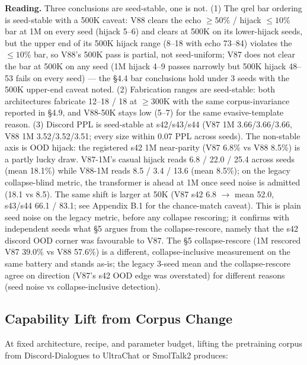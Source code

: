 \documentclass[11pt]{article}
\begin{document}
\textbf{Reading.} Three conclusions are seed-stable, one is not. (1) The qrel bar ordering is seed-stable with a 500K caveat: V88 clears the echo $\geq 50\%$ / hijack $\leq 10\%$ bar at 1M on every seed (hijack 5--6) and clears at 500K on its lower-hijack seeds, but the upper end of its 500K hijack range (8--18 with echo 73--84) violates the $\leq 10\%$ bar, so V88's 500K pass is partial, not seed-uniform; V87 does not clear the bar at 500K on any seed (1M hijack 4--9 passes narrowly but 500K hijack 48--53 fails on every seed) --- the \S4.4 bar conclusions hold under 3 seeds with the 500K upper-end caveat noted. (2) Fabrication ranges are seed-stable: both architectures fabricate 12--18 / 18 at $\geq 300$K with the same corpus-invariance reported in \S4.9, and V88-50K stays low (5--7) for the same evasive-template reason. (3) Discord PPL is seed-stable at s42/s43/s44 (V87 1M 3.66/3.66/3.66, V88 1M 3.52/3.52/3.51; every size within 0.07 PPL across seeds). The non-stable axis is OOD hijack: the registered s42 1M near-parity (V87 6.8\% vs V88 8.5\%) is a partly lucky draw. V87-1M's casual hijack reads 6.8 / 22.0 / 25.4 across seeds (mean 18.1\%) while V88-1M reads 8.5 / 3.4 / 13.6 (mean 8.5\%); on the legacy collapse-blind metric, the transformer is ahead at 1M once seed noise is admitted (18.1 vs 8.5). The same shift is larger at 50K (V87 s42 6.8 $\to$ mean 52.0, s43/s44 66.1 / 83.1; see Appendix B.1 for the chance-match caveat). This is plain seed noise on the legacy metric, before any collapse rescoring; it confirms with independent seeds what \S5 argues from the collapse-rescore, namely that the s42 discord OOD corner was favourable to V87. The \S5 collapse-rescore (1M rescored V87 39.0\% vs V88 57.6\%) is a different, collapse-inclusive measurement on the same battery and stands as-is; the legacy 3-seed mean and the collapse-rescore agree on direction (V87's s42 OOD edge was overstated) for different reasons (seed noise vs collapse-inclusive detection).

\subsection{Capability Lift from Corpus Change}

At fixed architecture, recipe, and parameter budget, lifting the pretraining corpus from Discord-Dialogues to UltraChat or SmolTalk2 produces:
\end{document}
